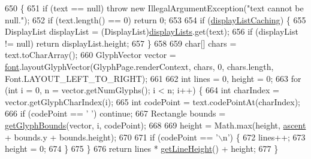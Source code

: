 \begin{DoxyCode}
650                                        \{
651         \textcolor{keywordflow}{if} (text == null) \textcolor{keywordflow}{throw} \textcolor{keyword}{new} IllegalArgumentException(\textcolor{stringliteral}{"text cannot be null."});
652         \textcolor{keywordflow}{if} (text.length() == 0) \textcolor{keywordflow}{return} 0;
653 
654         \textcolor{keywordflow}{if} (\mbox{\hyperlink{classorg_1_1newdawn_1_1slick_1_1_unicode_font_aad1040617fd0167c54d6dd3511c6bd48}{displayListCaching}}) \{
655             DisplayList displayList = (DisplayList)\mbox{\hyperlink{classorg_1_1newdawn_1_1slick_1_1_unicode_font_a66750034039374bef370150798d64f95}{displayLists}}.get(text);
656             \textcolor{keywordflow}{if} (displayList != null) \textcolor{keywordflow}{return} displayList.height;
657         \}
658 
659         \textcolor{keywordtype}{char}[] chars = text.toCharArray();
660         GlyphVector vector = \mbox{\hyperlink{classorg_1_1newdawn_1_1slick_1_1_unicode_font_a956ab491839be375d47444a67ebff11c}{font}}.layoutGlyphVector(GlyphPage.renderContext, chars, 0, chars.length, 
      Font.LAYOUT\_LEFT\_TO\_RIGHT);
661 
662         \textcolor{keywordtype}{int} lines = 0, height = 0;
663         \textcolor{keywordflow}{for} (\textcolor{keywordtype}{int} i = 0, n = vector.getNumGlyphs(); i < n; i++) \{
664             \textcolor{keywordtype}{int} charIndex = vector.getGlyphCharIndex(i);
665             \textcolor{keywordtype}{int} codePoint = text.codePointAt(charIndex);
666             \textcolor{keywordflow}{if} (codePoint == \textcolor{charliteral}{' '}) \textcolor{keywordflow}{continue};
667             Rectangle bounds = \mbox{\hyperlink{classorg_1_1newdawn_1_1slick_1_1_unicode_font_a61a42b9754ad2307b80a8699d484a158}{getGlyphBounds}}(vector, i, codePoint);
668 
669             height = Math.max(height, \mbox{\hyperlink{classorg_1_1newdawn_1_1slick_1_1_unicode_font_a195706fa1491e793a4b923dd844b594f}{ascent}} + bounds.y + bounds.height);
670 
671             \textcolor{keywordflow}{if} (codePoint == \textcolor{charliteral}{'\(\backslash\)n'}) \{
672                 lines++;
673                 height = 0;
674             \}
675         \}
676         \textcolor{keywordflow}{return} lines * \mbox{\hyperlink{classorg_1_1newdawn_1_1slick_1_1_unicode_font_a4f245d11a64ccc71aa9b1d48d89cbc09}{getLineHeight}}() + height;
677     \}
\end{DoxyCode}
\mbox{\label{classorg_1_1newdawn_1_1slick_1_1_unicode_font_a6b413725e820d98254b8c6b8af68976e}} 
